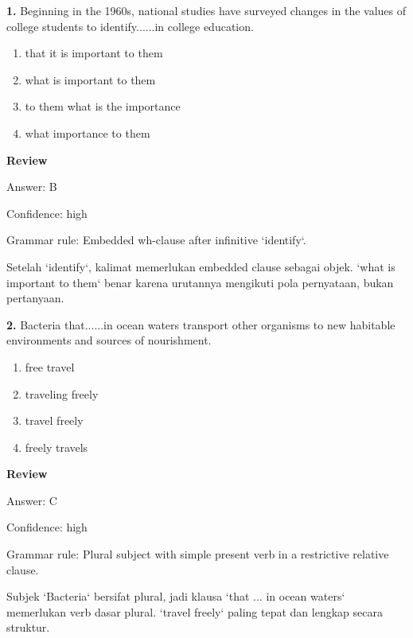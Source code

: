 \documentclass[12pt]{article}
\begin{document}
\noindent\textbf{1.} Beginning in the 1960s, national studies have surveyed changes in the values of college students to identify......in college education.
\begin{enumerate}[label=(\Alph*),leftmargin=*,itemsep=0.2em]
\item that it is important to them
\item what is important to them
\item to them what is the importance
\item what importance to them
\end{enumerate}
\par
\begingroup
\setlength{\parskip}{0pt}
\setlength{\parindent}{0pt}
\textbf{Review}\par
Answer: B\par
Confidence: high\par
Grammar rule: Embedded wh-clause after infinitive `identify`.\par
Setelah `identify`, kalimat memerlukan embedded clause sebagai objek. `what is important to them` benar karena urutannya mengikuti pola pernyataan, bukan pertanyaan.\par
\endgroup
\par
\vspace{0.25\baselineskip}
\noindent\textbf{2.} Bacteria that......in ocean waters transport other organisms to new habitable environments and sources of nourishment.
\begin{enumerate}[label=(\Alph*),leftmargin=*,itemsep=0.2em]
\item free travel
\item traveling freely
\item travel freely
\item freely travels
\end{enumerate}
\par
\begingroup
\setlength{\parskip}{0pt}
\setlength{\parindent}{0pt}
\textbf{Review}\par
Answer: C\par
Confidence: high\par
Grammar rule: Plural subject with simple present verb in a restrictive relative clause.\par
Subjek `Bacteria` bersifat plural, jadi klausa `that ... in ocean waters` memerlukan verb dasar plural. `travel freely` paling tepat dan lengkap secara struktur.\par
\endgroup
\par
\vspace{0.25\baselineskip}
\end{document}

